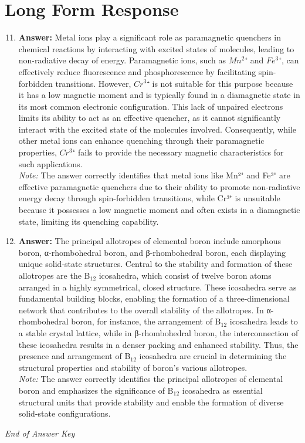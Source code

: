\documentclass[12pt]{article}
\begin{document}
\section*{Long Form Response}
\begin{enumerate}[label=\arabic*.]
\setcounter{enumi}{10}
\item \textbf{Answer:} Metal ions play a significant role as paramagnetic quenchers in chemical reactions by interacting with excited states of molecules, leading to non-radiative decay of energy. Paramagnetic ions, such as $Mn^2$⁺ and $Fe^3$⁺, can effectively reduce fluorescence and phosphorescence by facilitating spin-forbidden transitions. However, $Cr^3$⁺ is not suitable for this purpose because it has a low magnetic moment and is typically found in a diamagnetic state in its most common electronic configuration. This lack of unpaired electrons limits its ability to act as an effective quencher, as it cannot significantly interact with the excited state of the molecules involved. Consequently, while other metal ions can enhance quenching through their paramagnetic properties, $Cr^3$⁺ fails to provide the necessary magnetic characteristics for such applications.
\\ \textit{Note:} The answer correctly identifies that metal ions like Mn²⁺ and Fe³⁺ are effective paramagnetic quenchers due to their ability to promote non-radiative energy decay through spin-forbidden transitions, while Cr³⁺ is unsuitable because it possesses a low magnetic moment and often exists in a diamagnetic state, limiting its quenching capability.
\item \textbf{Answer:} The principal allotropes of elemental boron include amorphous boron, α-rhombohedral boron, and β-rhombohedral boron, each displaying unique solid-state structures. Central to the stability and formation of these allotropes are the B$_{12}$ icosahedra, which consist of twelve boron atoms arranged in a highly symmetrical, closed structure. These icosahedra serve as fundamental building blocks, enabling the formation of a three-dimensional network that contributes to the overall stability of the allotropes. In α-rhombohedral boron, for instance, the arrangement of B$_{12}$ icosahedra leads to a stable crystal lattice, while in β-rhombohedral boron, the interconnection of these icosahedra results in a denser packing and enhanced stability. Thus, the presence and arrangement of B$_{12}$ icosahedra are crucial in determining the structural properties and stability of boron's various allotropes.
\\ \textit{Note:} The answer correctly identifies the principal allotropes of elemental boron and emphasizes the significance of B$_{12}$ icosahedra as essential structural units that provide stability and enable the formation of diverse solid-state configurations.
\end{enumerate}

\vfill
\noindent\textit{End of Answer Key}
\end{document}
